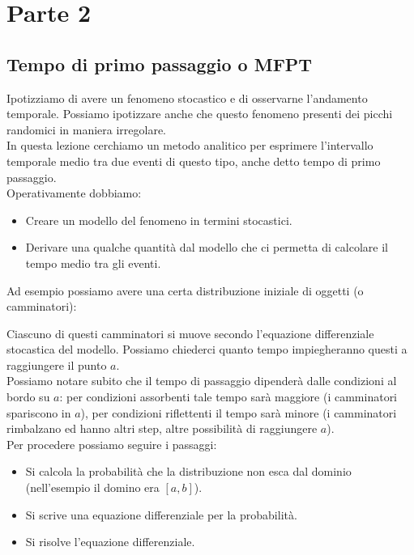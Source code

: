 \section*{Parte 2}%
\label{sub:Parte 2}
\subsection{Tempo di primo passaggio o MFPT}%
\label{sub:Tempo di primo passaggio o MFPT}
Ipotizziamo di avere un fenomeno stocastico e di osservarne l'andamento temporale. Possiamo ipotizzare anche che questo fenomeno presenti dei picchi randomici in maniera irregolare. \\
In questa lezione cerchiamo un metodo analitico per esprimere l'intervallo temporale medio tra due eventi di questo tipo, anche detto tempo di primo passaggio.\\
Operativamente dobbiamo:
\begin{itemize}
    \item Creare un modello del fenomeno in termini stocastici.
    \item Derivare una qualche quantità dal modello che ci permetta di calcolare il tempo medio tra gli eventi.
\end{itemize}
Ad esempio possiamo avere una certa distribuzione iniziale di oggetti (o camminatori):

\noindent
Ciascuno di questi camminatori si muove secondo l'equazione differenziale stocastica del modello. Possiamo chiederci quanto tempo impiegheranno questi a raggiungere il punto $a$. \\
Possiamo notare subito che il tempo di passaggio dipenderà dalle condizioni al bordo su $a$: per condizioni assorbenti tale tempo sarà maggiore (i camminatori spariscono in $a$), per condizioni riflettenti il tempo sarà minore (i camminatori rimbalzano ed hanno altri step, altre possibilità di raggiungere $a$).\\
Per procedere possiamo seguire i passaggi:
\begin{itemize}
    \item Si calcola la probabilità che la distribuzione non esca dal dominio (nell'esempio il domino era $[a,b]$).
    \item Si scrive una equazione differenziale per la probabilità.
    \item Si risolve l'equazione differenziale.
\end{itemize}

